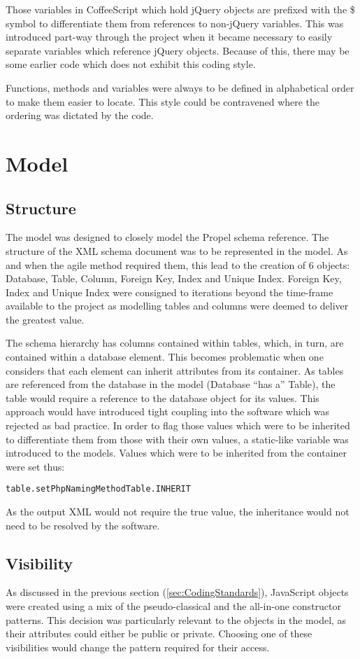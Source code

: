 Those variables in Coffee\-Script which hold jQuery objects are prefixed with the \$ symbol to differentiate them from references to non-jQuery variables. This was introduced part-way through the project when it became necessary to easily separate variables which reference jQuery objects. Because of this, there may be some earlier code which does not exhibit this coding style.

Functions, methods and variables were always to be defined in alphabetical order to make them easier to locate. This style could be contravened where the ordering was dictated by the code.

\section{Model}\label{sec:DesignModel}
\subsection{Structure}
The model was designed to closely model the Propel schema reference. The structure of the XML schema document was to be represented in the model. As and when the agile method required them, this lead to the creation of 6 objects: Database, Table, Column, Foreign Key, Index and Unique Index. Foreign Key, Index and Unique Index were consigned to iterations beyond the time-frame available to the project as modelling tables and columns were deemed to deliver the greatest value.

The schema hierarchy has columns contained within tables, which, in turn, are contained within a database element. This becomes problematic when one considers that each element can inherit attributes from its container. As tables are referenced from the database in the model (Database ``has a'' Table), the table would require a reference to the database object for its values. This approach would have introduced tight coupling into the software which was rejected as bad practice. In order to flag those values which were to be inherited to differentiate them from those with their own values, a static-like variable was introduced to the models. Values which were to be inherited from the container were set thus:
\begin{alltt}table.setPhpNamingMethod Table.INHERIT\end{alltt}
As the output XML would not require the true value, the inheritance would not need to be resolved by the software.

\subsection{Visibility}
As discussed in the previous section (\ref{sec:CodingStandards}), Java\-Script objects were created using a mix of the pseudo-classical and the all-in-one constructor patterns. This decision was particularly relevant to the objects in the model, as their attributes could either be public or private. Choosing one of these visibilities would change the pattern required for their access.

